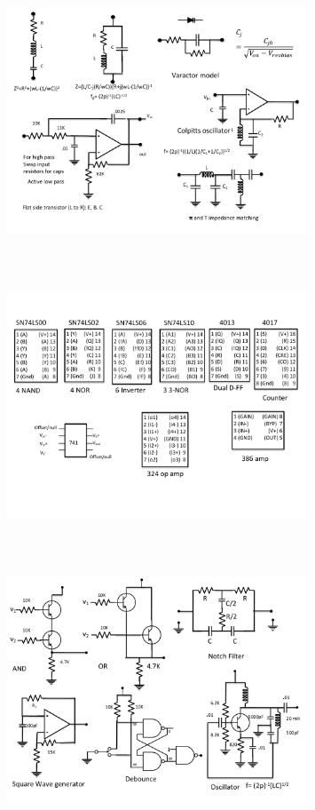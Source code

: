 \begin{figure} 
\center
\includegraphics[width=0.8\textwidth,natwidth=642,natheight=610, height=80mm, width=88mm]{circuit5.pdf}
\end{figure}
\begin{figure} 
\center
\includegraphics[width=0.8\textwidth,natwidth=642,natheight=610, height=80mm, width=88mm]{circuit6.pdf}
\end{figure}
\begin{figure} 
\center
\includegraphics[width=0.8\textwidth,natwidth=642,natheight=610, height=80mm, width=88mm]{circuit7.pdf}
\end{figure}
